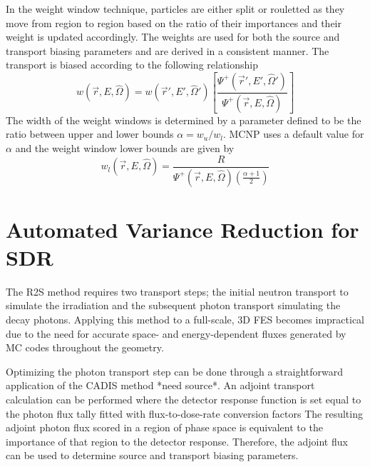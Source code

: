 In the weight window technique, particles are either split or
rouletted as they move from region to region based on the ratio of their
importances and their weight is updated accordingly.  
The weights are used for both the source and transport biasing parameters and
are derived %
in a consistent manner.  
The transport is biased according to the following relationship
\begin{equation} \label{eq:3.11}
	w(\overrightarrow{r}, E, \widehat{\Omega})=
	w(\overrightarrow{r}', E', \widehat{\Omega}')
	\left [ \frac{\Psi^{+}(\overrightarrow{r}', E', \widehat{\Omega}')}
	{\Psi^{+}(\overrightarrow{r}, E, \widehat{\Omega})} \right ]
\end{equation}
The width of the weight windows is determined by a parameter defined to be the
ratio between upper and lower bounds $\alpha =
w_{u}/w_{l}$.  MCNP uses a default value for $\alpha$ and the weight window lower
bounds are given by 
\begin{equation} \label{eq:3.12}
	w_{l}(\overrightarrow{r}, E, \widehat{\Omega}) = 
	\frac{R}{\Psi^{+}(\overrightarrow{r}, E, \widehat{\Omega})
	(\frac{\alpha + 1}{2})}
\end{equation}


\section{Automated Variance Reduction for SDR}\label{sec:auto_vr_sdr}

The R2S method requires two transport steps; 
the initial neutron transport to simulate the irradiation and the subsequent photon
transport simulating the decay photons.  
Applying this method to a full-scale, 3D FES becomes impractical due to the
need for accurate space- and energy-dependent fluxes generated by MC codes 
throughout the geometry.  

Optimizing the photon transport step can be done through a
straightforward application of the CADIS %
method *need source*. 
An adjoint transport calculation can be performed where the detector
response function is set equal to the photon flux tally fitted with
flux-to-dose-rate conversion factors
The resulting adjoint photon flux scored in a region of phase space is equivalent
to the importance of that region to the detector response.
Therefore, the adjoint flux can be used to determine source and transport
biasing parameters.

